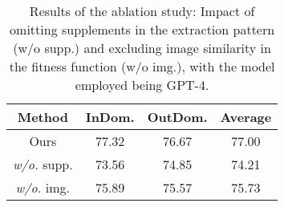 
\begin{table}[!t]
    \centering
    \small
    \setlength\tabcolsep{8.8pt} %
    \renewcommand{\arraystretch}{0.9}  %

    \begin{tabular}{ccc|c}
        \toprule
        \textbf{Method} & \textbf{InDom.} & \textbf{OutDom.} & \textbf{Average} \\
        \midrule
        Ours  & 77.32 & 76.67 & 77.00 \\ 
        \hspace{2pt}\textit{w/o.} supp.   & 73.56 & 74.85 & 74.21 \\
        \hspace{2pt}\textit{w/o.} img.    & 75.89 & 75.57 & 75.73 \\ 
        \bottomrule
    \end{tabular}
    \caption{Results of the ablation study: Impact of omitting supplements in the extraction pattern (w/o supp.) and excluding image similarity in the fitness function (w/o img.), with the model employed being GPT-4.}
    \label{tb:abalation}
\end{table}
